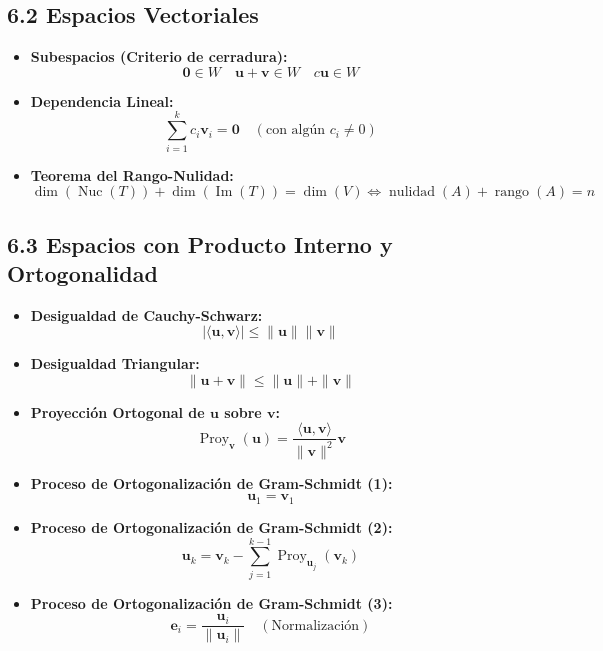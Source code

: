 \documentclass[11pt,a4paper]{article}
\begin{document}
\subsection*{6.2 Espacios Vectoriales}

\begin{itemize}
  \item \textbf{Subespacios (Criterio de cerradura):}
  \[
    \mathbf{0} \in W \quad \mathbf{u} + \mathbf{v} \in W \quad c\mathbf{u} \in W
  \]
  \item \textbf{Dependencia Lineal:}
  \[
    \sum_{i=1}^k c_i \mathbf{v}_i = \mathbf{0} \quad (\text{con algún } c_i \ne 0)
  \]
  \item \textbf{Teorema del Rango-Nulidad:}
  \[
    \dim(\operatorname{Nuc}(T)) + \dim(\operatorname{Im}(T)) = \dim(V) \iff \operatorname{nulidad}(A) + \operatorname{rango}(A) = n
  \]
\end{itemize}

\subsection*{6.3 Espacios con Producto Interno y Ortogonalidad}

\begin{itemize}
  \item \textbf{Desigualdad de Cauchy-Schwarz:}
  \[
    |\langle \mathbf{u}, \mathbf{v} \rangle| \le \|\mathbf{u}\| \|\mathbf{v}\|
  \]
  \item \textbf{Desigualdad Triangular:}
  \[
    \|\mathbf{u} + \mathbf{v}\| \le \|\mathbf{u}\| + \|\mathbf{v}\|
  \]
  \item \textbf{Proyección Ortogonal de $\mathbf{u}$ sobre $\mathbf{v}$:}
  \[
    \operatorname{Proy}_{\mathbf{v}}(\mathbf{u}) = \frac{\langle \mathbf{u}, \mathbf{v} \rangle}{\|\mathbf{v}\|^2} \mathbf{v}
  \]
  \item \textbf{Proceso de Ortogonalización de Gram-Schmidt (1):}
  \[
    \mathbf{u}_1 = \mathbf{v}_1
  \]
  \item \textbf{Proceso de Ortogonalización de Gram-Schmidt (2):}
  \[
    \mathbf{u}_k = \mathbf{v}_k - \sum_{j=1}^{k-1} \operatorname{Proy}_{\mathbf{u}_j}(\mathbf{v}_k)
  \]
  \item \textbf{Proceso de Ortogonalización de Gram-Schmidt (3):}
  \[
    \mathbf{e}_i = \frac{\mathbf{u}_i}{\|\mathbf{u}_i\|} \quad (\text{Normalización})
  \]
\end{itemize}
\end{document}
